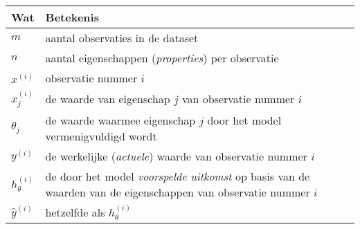 \begin{tabular}{p{1cm} || p{10cm} }
    \textbf{Wat} & \textbf{Betekenis} \\
    \hline
    $m$ & aantal observaties in de dataset \\[3pt]
    $n$ & aantal eigenschappen (\textit{properties}) per observatie \\[3pt]
    $x^{(i)}$ & observatie nummer $i$ \\[3pt]
    $x_j^{(i)}$ & de waarde van eigenschap $j$ van observatie nummer $i$ \\[3pt]
    $\theta_j$ & de waarde waarmee eigenschap $j$ door het model vermenigvuldigd wordt \\[3pt]
    $y^{(i)}$ & de werkelijke (\textit{actuele}) waarde van observatie nummer $i$ \\[3pt]
    $h_\theta^{(i)}$ & de door het model \textit{voorspelde uitkomst} op basis van de waarden van de eigenschappen van observatie nummer $i$ \\[3pt]
    $\hat{y}^{(i)}$ & hetzelfde als $h_\theta^{(i)}$ \\[3pt]
\end{tabular}
